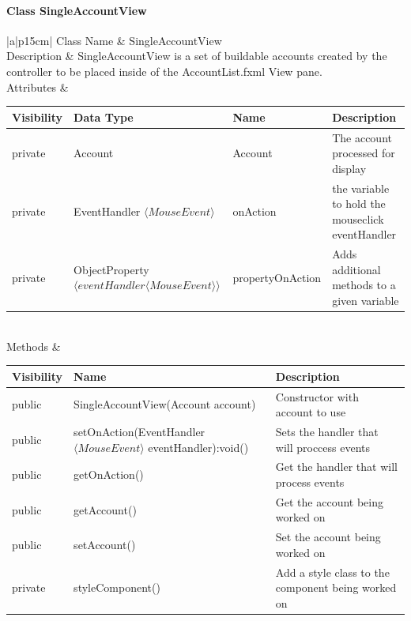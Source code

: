 \documentclass[12pt]{article}
\begin{document}
\paragraph{Class SingleAccountView}
\begin{table}[H]
	\begin{tabular}{|a|p{15cm}|}
		\hline
		{Class Name} & {SingleAccountView} \\
		\hline
		Description & SingleAccountView is a set of buildable accounts created by the controller to be placed inside of the AccountList.fxml View pane.\\
		\hline
		Attributes & 
		\begin{tabular}{| p{1.5cm} | p{5.5cm} | p{3.0cm} | p{3.45cm} |}
			\hline
			\rowcolor{lightgray}
			Visibility & Data Type & Name & Description \\
			\hline
			\rowcolor{white}
			private & Account & Account & The account processed for display\\
			\hline
			private & EventHandler $\langle MouseEvent \rangle$ & onAction & the variable to hold the mouseclick eventHandler\\
			\hline	
			private & ObjectProperty $\langle eventHandler \langle MouseEvent \rangle \rangle$ & propertyOnAction & Adds additional methods to a given variable\\
			\hline	
		\end{tabular} \\
		\hline
		Methods & 		 
		\begin{tabular}{| p{2cm} | p{5cm} | p{6.9cm} |}
			\hline
			\rowcolor{gray}
			{Visibility} &{Name} & {Description} \\
			\hline
			\rowcolor{white}			
			public & SingleAccountView(Account account) & Constructor with account to use\\
			\hline
			public & setOnAction(EventHandler $\langle MouseEvent \rangle$ eventHandler):void() & Sets the handler that will proccess events\\
			\hline
			public & getOnAction() & Get the handler that will process events\\
			\hline
			public & getAccount() & Get the account being worked on\\
			\hline
			public & setAccount() & Set the account being worked on\\
			\hline
			private & styleComponent() & Add a style class to the component being worked on\\
			\hline
		\end{tabular}								 
	\end{tabular}
\end{table}
\end{document}
